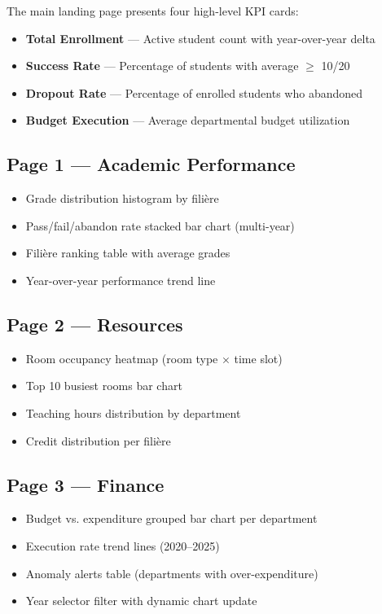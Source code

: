 \documentclass[12pt, a4paper]{report}
\begin{document}
The main landing page presents four high-level KPI cards:

\begin{itemize}
  \item \textbf{Total Enrollment} — Active student count with year-over-year delta
  \item \textbf{Success Rate} — Percentage of students with average $\geq$ 10/20
  \item \textbf{Dropout Rate} — Percentage of enrolled students who abandoned
  \item \textbf{Budget Execution} — Average departmental budget utilization
\end{itemize}

\subsection{Page 1 — Academic Performance}

\begin{itemize}
  \item Grade distribution histogram by filière
  \item Pass/fail/abandon rate stacked bar chart (multi-year)
  \item Filière ranking table with average grades
  \item Year-over-year performance trend line
\end{itemize}

\subsection{Page 2 — Resources}

\begin{itemize}
  \item Room occupancy heatmap (room type × time slot)
  \item Top 10 busiest rooms bar chart
  \item Teaching hours distribution by department
  \item Credit distribution per filière
\end{itemize}

\subsection{Page 3 — Finance}

\begin{itemize}
  \item Budget vs. expenditure grouped bar chart per department
  \item Execution rate trend lines (2020--2025)
  \item Anomaly alerts table (departments with over-expenditure)
  \item Year selector filter with dynamic chart update
\end{itemize}
\end{document}
